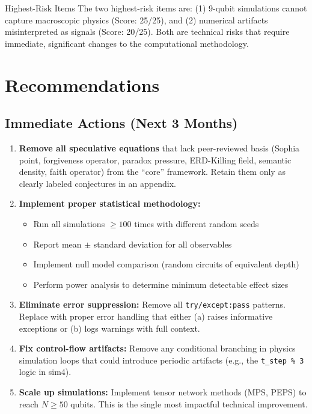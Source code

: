 \documentclass[11pt,a4paper]{article}
\begin{document}
\begin{critbox}{Highest-Risk Items}
The two highest-risk items are: (1) 9-qubit simulations cannot capture macroscopic physics (Score: 25/25), and (2) numerical artifacts misinterpreted as signals (Score: 20/25). Both are technical risks that require immediate, significant changes to the computational methodology.
\end{critbox}

\section{Recommendations}

\subsection{Immediate Actions (Next 3 Months)}

\begin{enumerate}[leftmargin=1.5em]
  \item \textbf{Remove all speculative equations} that lack peer-reviewed basis (Sophia point, forgiveness operator, paradox pressure, ERD-Killing field, semantic density, faith operator) from the ``core'' framework. Retain them only as clearly labeled conjectures in an appendix.
  
  \item \textbf{Implement proper statistical methodology:}
  \begin{itemize}
    \item Run all simulations $\geq 100$ times with different random seeds
    \item Report mean $\pm$ standard deviation for all observables
    \item Implement null model comparison (random circuits of equivalent depth)
    \item Perform power analysis to determine minimum detectable effect sizes
  \end{itemize}
  
  \item \textbf{Eliminate error suppression:} Remove all \texttt{try/except:pass} patterns. Replace with proper error handling that either (a) raises informative exceptions or (b) logs warnings with full context.
  
  \item \textbf{Fix control-flow artifacts:} Remove any conditional branching in physics simulation loops that could introduce periodic artifacts (e.g., the \texttt{t\_step \% 3} logic in sim4).
  
  \item \textbf{Scale up simulations:} Implement tensor network methods (MPS, PEPS) to reach $N \geq 50$ qubits. This is the single most impactful technical improvement.
\end{enumerate}
\end{document}
